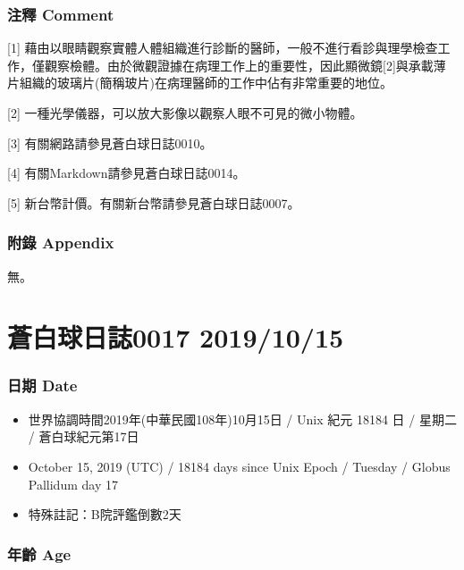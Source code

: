 \documentclass[a5paper, 12pt
]{book}
\providecommand{\tightlist}{%
  \setlength{\itemsep}{0pt}\setlength{\parskip}{0pt}}
\begin{document}
\hypertarget{ux6ce8ux91cb-comment-9}{%
\subsubsection{注釋 Comment}\label{ux6ce8ux91cb-comment-9}}

{[}1{]}
藉由以眼睛觀察實體人體組織進行診斷的醫師，一般不進行看診與理學檢查工作，僅觀察檢體。由於微觀證據在病理工作上的重要性，因此顯微鏡{[}2{]}與承載薄片組織的玻璃片(簡稱玻片)在病理醫師的工作中佔有非常重要的地位。

{[}2{]} 一種光學儀器，可以放大影像以觀察人眼不可見的微小物體。

{[}3{]} 有關網路請參見蒼白球日誌0010。

{[}4{]} 有關Markdown請參見蒼白球日誌0014。

{[}5{]} 新台幣計價。有關新台幣請參見蒼白球日誌0007。

\hypertarget{ux9644ux9304-appendix-8}{%
\subsubsection{附錄 Appendix}\label{ux9644ux9304-appendix-8}}

無。

\hypertarget{ux84bcux767dux7403ux65e5ux8a8c0017-20191015}{%
\section{蒼白球日誌0017
2019/10/15}\label{ux84bcux767dux7403ux65e5ux8a8c0017-20191015}}

\hypertarget{ux65e5ux671f-date-16}{%
\subsubsection{日期 Date}\label{ux65e5ux671f-date-16}}

\begin{itemize}
\tightlist
\item
  世界協調時間2019年(中華民國108年)10月15日 / Unix 紀元 18184 日 /
  星期二 / 蒼白球紀元第17日
\item
  October 15, 2019 (UTC) / 18184 days since Unix Epoch / Tuesday /
  Globus Pallidum day 17
\item
  特殊註記：B院評鑑倒數2天
\end{itemize}

\hypertarget{ux5e74ux9f61-age-16}{%
\subsubsection{年齡 Age}\label{ux5e74ux9f61-age-16}}
\end{document}
